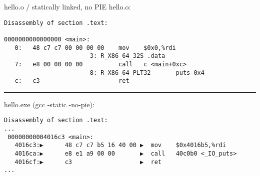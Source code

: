 \begin{frame}[fragile]{hello.o / statically linked, no PIE}
hello.o:
\begin{Verbatim}[commandchars=\\\{\},fontsize=\fontsize{9}{10}\selectfont]
Disassembly of section .text:

0000000000000000 <main>:
   0:   48 c7 c7 00 00 00 00    mov    $0x0,%rdi
                        3: R_X86_64_32S .data
   7:   e8 00 00 00 00          call   c <main+0xc>
                        8: R_X86_64_PLT32       puts-0x4
   c:   c3                      ret    
\end{Verbatim}
\hrule
hello.exe (gcc -static -no-pie):
\begin{Verbatim}[commandchars=\\\{\},fontsize=\fontsize{9}{10}\selectfont]
Disassembly of section .text:
...
 00000000004016c3 <main>:
   4016c3:▶      48 c7 c7 b5 16 40 00 ▶  mov    $0x4016b5,%rdi
   4016ca:▶      e8 e1 a9 00 00       ▶  call   40c0b0 <_IO_puts>
   4016cf:▶      c3                   ▶  ret    
...
\end{Verbatim}
\end{frame}

